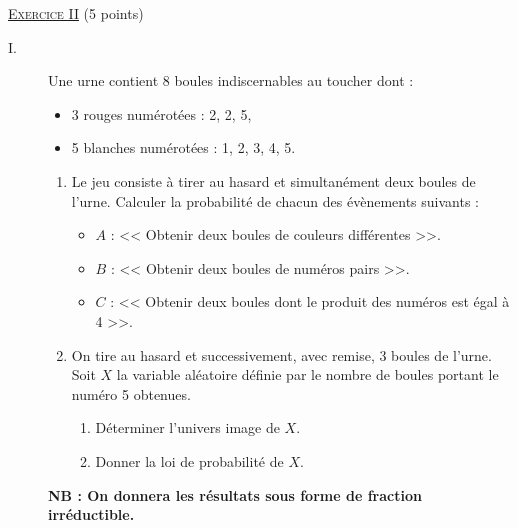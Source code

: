 \noindent \underline{\textsc{Exercice II}} (5 points) 
      \begin{description}
            \item[I.] Une urne contient 8 boules indiscernables au toucher dont :
                  \begin{itemize}
                        \item 3 rouges num\'erot\'ees : 2, 2, 5,
                        \item 5 blanches num\'erot\'ees : 1, 2, 3, 4, 5.
                  \end{itemize}
                  \begin{enumerate}
                        \item Le jeu consiste \`a tirer au hasard et simultan\'ement deux boules de l'urne.
                              Calculer la probabilit\'e de chacun des \'ev\`enements suivants :
                              \begin{itemize}
                                    \item $A$ : << Obtenir deux boules de couleurs diff\'erentes >>.
                                    \item $B$ : << Obtenir deux boules de num\'eros pairs >>.
                                    \item $C$ : << Obtenir deux boules dont le produit des num\'eros est \'egal \`a 4 >>.
                              \end{itemize}
                        \item On tire au hasard et successivement, avec remise, 3 boules de l'urne.
                              Soit $X$ la variable al\'eatoire d\'efinie par le nombre de boules portant le num\'ero 5 obtenues.
                              \begin{enumerate}
                                    \item D\'eterminer l'univers image de $X$.
                                    \item Donner la loi de probabilit\'e de $X$.
                              \end{enumerate}
                  \end{enumerate}
                  \textbf{NB : On donnera les r\'esultats sous forme de fraction irr\'eductible.}

\end{description}
